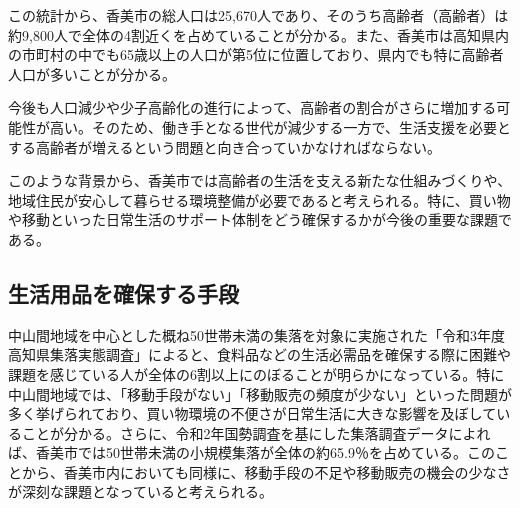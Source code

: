 
この統計から、香美市の総人口は25,670人であり、そのうち高齢者（高齢者）は約9,800人で全体の4割近くを占めていることが分かる。また、香美市は高知県内の市町村の中でも65歳以上の人口が第5位に位置しており、県内でも特に高齢者人口が多いことが分かる。

今後も人口減少や少子高齢化の進行によって、高齢者の割合がさらに増加する可能性が高い。そのため、働き手となる世代が減少する一方で、生活支援を必要とする高齢者が増えるという問題と向き合っていかなければならない。

このような背景から、香美市では高齢者の生活を支える新たな仕組みづくりや、地域住民が安心して暮らせる環境整備が必要であると考えられる。特に、買い物や移動といった日常生活のサポート体制をどう確保するかが今後の重要な課題である。



\subsection{生活用品を確保する手段}
中山間地域を中心とした概ね50世帯未満の集落を対象に実施された「令和3年度高知県集落実態調査」によると、食料品などの生活必需品を確保する際に困難や課題を感じている人が全体の6割以上にのぼることが明らかになっている。特に中山間地域では、「移動手段がない」「移動販売の頻度が少ない」といった問題が多く挙げられており、買い物環境の不便さが日常生活に大きな影響を及ぼしていることが分かる。さらに、令和2年国勢調査を基にした集落調査データによれば、香美市では50世帯未満の小規模集落が全体の約65.9％を占めている。このことから、香美市内においても同様に、移動手段の不足や移動販売の機会の少なさが深刻な課題となっていると考えられる。


